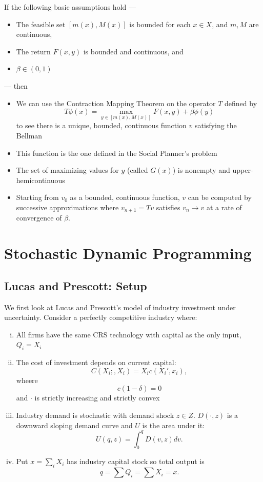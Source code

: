\documentclass{tufte-handout}
\theoremstyle{definition}
\begin{document}
If the following basic assumptions hold --- 
\begin{itemize}
	\item The feasible set $[m(x),M(x)]$ is bounded for each $x \in X$, and $m,M$ are continuous,
	\item The return $F(x,y)$ is bounded and continuous, and
	\item $\beta \in (0,1)$
\end{itemize}
--- then 
\begin{itemize}
	\item We can use the Contraction Mapping Theorem on the operator $T$ defined by \[
		T \phi(x) = \max_{y \in \left[ m(x),M(x) \right]} F(x,y) + \beta \phi(y)
	\] to see there is a unique, bounded, continuous function $v$ satisfying the Bellman
	\item This function is the one defined in the Social Planner's problem
	\item The set of maximizing values for $y$ (called $G(x)$) is nonempty and upper-hemicontinuous
	\item Starting from $v_0$ as a bounded, continuous function, $v$ can be computed by successive approximations where $v_{n+1} = Tv$ satisfies $v_n \to v$ at a rate of convergence of $\beta$.
\end{itemize}

\section{Stochastic Dynamic Programming}
\subsection{Lucas and Prescott: Setup}
We first look at Lucas and Prescott's model of industry investment under uncertainty. 
Consider a perfectly competitive industry where:
\begin{enumerate}[(i)]
	\item All firms have the same CRS technology with capital as the only input, $Q_i = X_i$
	\item The cost of investment depends on current capital: \[
		C(X_i;,X_i) = X_i c(X_i',x_i)
	,\] wheere \[
		c(1-\delta)=0
	\] and $\cdot$ is strictly increasing and strictly convex
	\item Industry demand is stochastic with demand shock $z \in Z$. $D(\cdot, z)$ is a downward sloping demand curve and $U$ is the area under it: \[
		U(q,z) = \int_{0}^{q} D(v,z)dv 
	.\] 
	\item Put $x = \sum_i X_i$ has industry capital stock so total output is \[
		q= \sum Q_i = \sum X_i = x
	.\] 
\end{enumerate}
\end{document}
